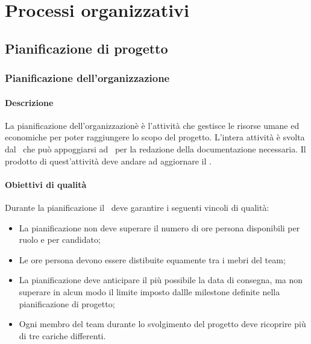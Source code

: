 \documentclass[../NormeDiProgetto_v4.0.0.tex]{subfiles}
\begin{document}
	
\section{Processi organizzativi}
	\subsection{Pianificazione di progetto}
		\subsubsection{Pianificazione dell'organizzazione}
			\paragraph{Descrizione}
				La pianificazione dell'organizzazionè è l'attività che gestisce le risorse umane ed economiche per poter raggiungere lo scopo del progetto.
				L'intera attività è svolta dal \responsabilediprogetto\ che può appoggiarsi ad \amministratori\ per la redazione della documentazione necessaria.
				Il prodotto di quest'attività deve andare ad aggiornare il \pianodiprogetto.
			
			\paragraph{Obiettivi di qualità}
				Durante la pianificazione il \responsabilediprogetto\ deve garantire i seguenti vincoli di qualità: 
				\begin{itemize}
					\item La pianificazione non deve superare il numero di ore persona disponibili per ruolo e per candidato;
					\item Le ore persona devono essere distibuite equamente tra i mebri del team;
					\item La pianificazione deve anticipare il più possibile la data di consegna, ma non superare in alcun modo il limite imposto dallle milestone definite nella pianificazione di progetto;
					\item Ogni membro del team durante lo svolgimento del progetto deve ricoprire più di tre cariche differenti.
				\end{itemize}
	
\end{document}
